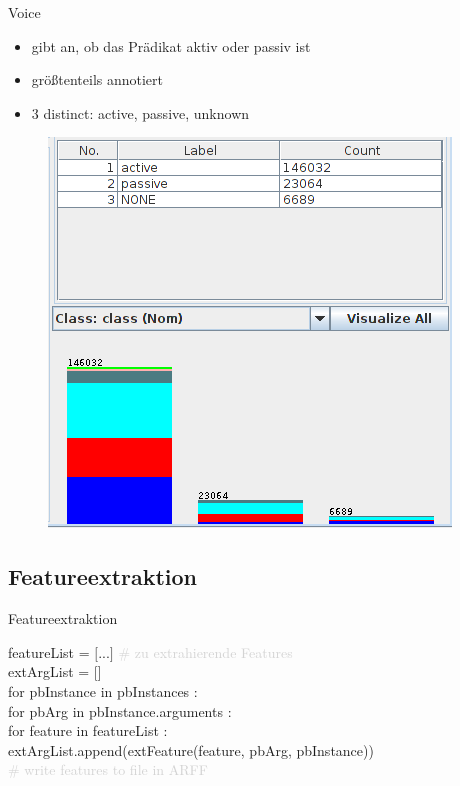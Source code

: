 \documentclass[10pt]{beamer}
\begin{document}
  \begin{frame}{Voice}
   \begin{itemize}
    \item gibt an, ob das Prädikat aktiv oder passiv ist
    \item größtenteils annotiert
    \item 3 distinct: active, passive, unknown
   \end{itemize}
  \begin{figure}
	  \begin{center}
	  	\includegraphics[scale=0.3]{voice}
	  \end{center}
  \end{figure}
  \end{frame}
  



\subsection{Featureextraktion}

\begin{frame}{Featureextraktion} 
\begin{small}
\hspace{10pt} featureList = $[$...$]$ \textcolor{lightgray}{\# zu extrahierende Features} \\
\hspace{10pt} extArgList = [] \\
\hspace{10pt} for pbInstance in pbInstances : \\
\hspace{30pt} 	for pbArg in pbInstance.arguments : \\
\hspace{30pt} 	for feature in featureList : \\
\hspace{50pt}	extArgList.append(extFeature(feature, pbArg, pbInstance)) \\
\hspace{10pt}   	\textcolor{lightgray}{ \# write features to file in ARFF} \\
\end{small}
\end{frame}
\end{document}
